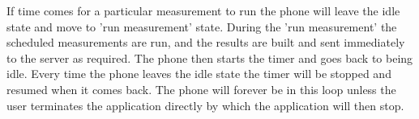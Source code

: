 If time comes for a particular measurement to run the phone will leave the idle state and move to 'run measurement' state.
During the 'run measurement' the scheduled measurements are run, and the results are built and sent immediately to the server as required.
The phone then starts the timer and goes back to being idle.
Every time the phone leaves the idle state the timer will be stopped and resumed when it comes back.
The phone will forever be in this loop unless the user terminates the application directly by which the application will then stop.